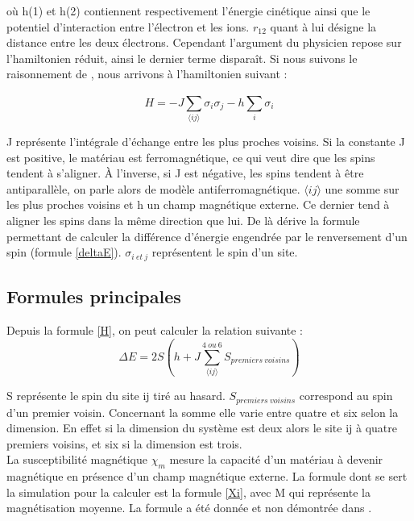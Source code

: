 \documentclass{article}
\begin{document}
où h(1) et h(2)  contiennent respectivement l'énergie cinétique ainsi que le potentiel d'interaction entre l'électron et les ions. $r_{12}$ quant à lui désigne la distance entre les deux électrons. Cependant l'argument du physicien repose sur l'hamiltonien réduit, ainsi le dernier terme disparaît. Si nous suivons le raisonnement de \cite{Phystat}, nous arrivons à l'hamiltonien suivant : 

\begin{equation}
   H=-J\sum_{\langle ij \rangle}^{}\sigma_{i}\sigma_{j}  - h\sum_{i}^{}\sigma_{i}
   \label{H}
\end{equation}

J représente l'intégrale d'échange entre les plus proches voisins. Si la constante J est positive, le matériau est ferromagnétique, ce qui veut dire que les spins tendent à s'aligner. À  l'inverse, si J est négative, les spins tendent à être antiparallèle, on parle alors de modèle antiferromagnétique. $\langle ij \rangle$ une somme sur les plus proches voisins et h un champ magnétique externe. Ce dernier tend à aligner les spins dans la même direction que  lui. De là dérive la formule permettant de calculer la différence d'énergie engendrée par le renversement d'un spin (formule \ref{deltaE}). $\sigma_{i \ et  \ j}$ représentent le spin d'un site.

\subsection{Formules principales}

Depuis la formule \ref{H}, on peut calculer la relation suivante :
\begin{equation}
    \Delta E=2S(h+J\sum_{\langle ij \rangle}^{4  \ ou \ 6}S_{premiers \ voisins})
    \label{deltaE}
\end{equation}

S représente le spin du site ij tiré au hasard. $S_{premiers \ voisins}$ correspond au spin d'un premier voisin. Concernant la somme elle varie entre quatre et six selon la dimension. En effet si la dimension du système est deux alors le site ij à quatre premiers voisins, et six si la dimension est trois. \\

La susceptibilité magnétique $\chi_m$ mesure la capacité d'un matériau à devenir magnétique en présence d'un champ magnétique externe. La formule dont se sert la simulation pour la calculer est la formule \ref{Xi}, avec M qui représente la magnétisation moyenne. La formule a été donnée et non démontrée dans \cite{Simu}.
\end{document}
